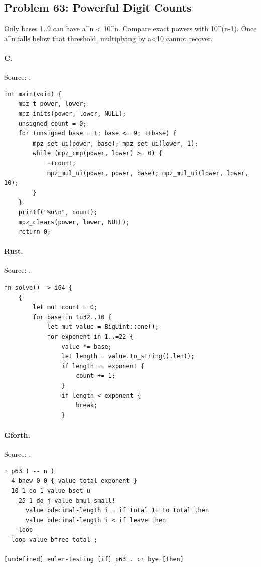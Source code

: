 \subsection{Problem 63: Powerful Digit Counts}
\label{walkthrough:p63}
Only bases 1..9 can have a\textasciicircum{}n < 10\textasciicircum{}n. Compare exact powers with 10\textasciicircum{}(n-1). Once a\textasciicircum{}n falls below that threshold, multiplying by a<10 cannot recover.

\paragraph{C.} Source: .
\begin{lstlisting}
int main(void) {
    mpz_t power, lower;
    mpz_inits(power, lower, NULL);
    unsigned count = 0;
    for (unsigned base = 1; base <= 9; ++base) {
        mpz_set_ui(power, base); mpz_set_ui(lower, 1);
        while (mpz_cmp(power, lower) >= 0) {
            ++count;
            mpz_mul_ui(power, power, base); mpz_mul_ui(lower, lower, 10);
        }
    }
    printf("%u\n", count);
    mpz_clears(power, lower, NULL);
    return 0;
\end{lstlisting}

\paragraph{Rust.} Source: .
\begin{lstlisting}
fn solve() -> i64 {
    {
        let mut count = 0;
        for base in 1u32..10 {
            let mut value = BigUint::one();
            for exponent in 1..=22 {
                value *= base;
                let length = value.to_string().len();
                if length == exponent {
                    count += 1;
                }
                if length < exponent {
                    break;
                }
\end{lstlisting}

\paragraph{Gforth.} Source: .
\begin{lstlisting}
: p63 ( -- n )
  4 bnew 0 0 { value total exponent }
  10 1 do 1 value bset-u
    25 1 do j value bmul-small!
      value bdecimal-length i = if total 1+ to total then
      value bdecimal-length i < if leave then
    loop
  loop value bfree total ;

[undefined] euler-testing [if] p63 . cr bye [then]
\end{lstlisting}

